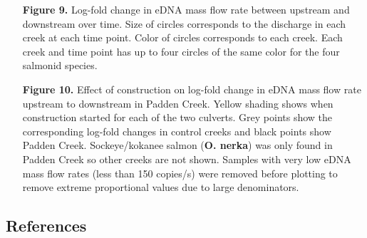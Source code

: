 \documentclass[
]{article}
\begin{document}
\begin{itemize}
\item[\textbf{Figure 9.}] Log-fold change in eDNA mass flow rate between upstream and downstream over time. Size of circles corresponds to the discharge in each creek at each time point. Color of circles corresponds to each creek. Each creek and time point has up to four circles of the same color for the four salmonid species.
\item[\textbf{Figure 10.}] Effect of construction on log-fold change in eDNA mass flow rate upstream to downstream in Padden Creek. Yellow shading shows when construction started for each of the two culverts. Grey points show the corresponding log-fold changes in control creeks and black points show Padden Creek. Sockeye/kokanee salmon (\textbf{O. nerka}) was only found in Padden Creek so other creeks are not shown. Samples with very low eDNA mass flow rates (less than 150 copies/s) were removed before plotting to remove extreme proportional values due to large denominators.

\end{itemize}

\newpage

\hypertarget{references}{%
\subsection*{References}\label{references}}
\end{document}
